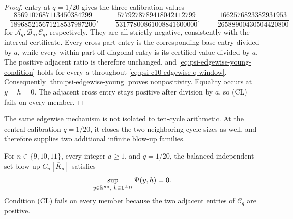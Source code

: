 \documentclass[11pt]{article}
\begin{document}
\begin{proof}
entry at $q=1/20$ gives the three calibration values
\begin{equation*}
 -\frac{8569107687113450384299}{189685215671218537987200},\quad
 -\frac{5779278789418042112799}{53177800861008841600000},\quad
 -\frac{1662576823382931953}{26588900430504420800}
\end{equation*}
for $\mathcal A_q,\mathcal B_q,\mathcal C_q$, respectively.  They are all
strictly negative, consistently with the interval certificate.  Every
cross-part entry is the corresponding base entry divided by $a$, while every
within-part off-diagonal entry is its certified value divided by $a$.  The
positive adjacent ratio is therefore unchanged, and
\cref{eq:psi-edgewise-young-condition} holds for every $a$ throughout
\eqref{eq:psi-c10-edgewise-q-window}.
Consequently
\cref{thm:psi-edgewise-young} proves nonpositivity.  Equality occurs at
$y=h=0$.  The adjacent cross entry stays positive after division by $a$, so
\textup{(CL)} fails on every member.
\end{proof}

The same edgewise mechanism is not isolated to ten-cycle arithmetic.  At the
central calibration $q=1/20$, it closes the two neighboring cycle sizes as
well, and therefore supplies two additional infinite blow-up families.

\begin{theorem}
\label{thm:psi-neighboring-cycle-edgewise}
For $n\in\{9,10,11\}$, every integer $a\geq1$, and $q=1/20$, the balanced
independent-set blow-up $C_n[\overline K_a]$ satisfies
\begin{equation}
 \sup_{y\in\mathbb R^{na},\ h\in\one^{\perp_D}}\Psi(y,h)=0.
 \label{eq:psi-neighboring-cycle-edgewise-sup}
\end{equation}
Condition \textup{(CL)} fails on every member because the two adjacent entries
of $\mathcal C_q$ are positive.
\end{theorem}
\end{document}
